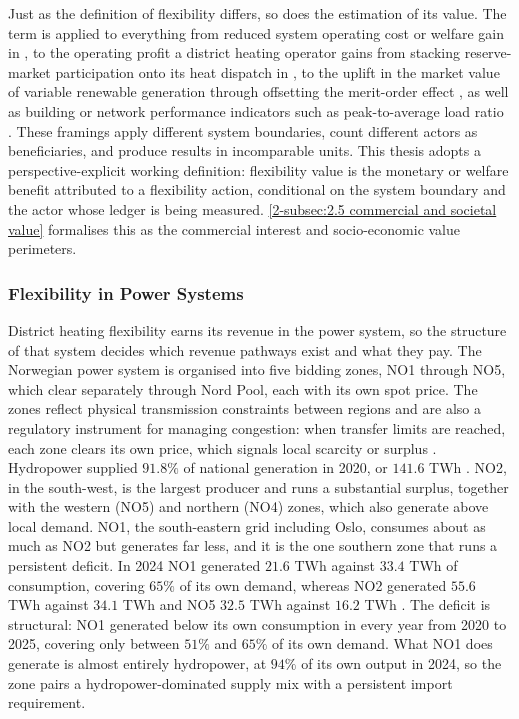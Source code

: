 Just as the definition of flexibility differs, so does the estimation of its value. The term is applied to everything from reduced system operating cost or welfare gain in \cite{mitridati_heat_2020}, to the operating profit a district heating operator gains from stacking reserve-market participation onto its heat dispatch in \cite{javanshir_operation_2022}, to the uplift in the market value of variable renewable generation through offsetting the merit-order effect \cite{kirkerud_power--heat_2017}, as well as building or network performance indicators such as peak-to-average load ratio \cite{li_ten_2022}. These framings apply different system boundaries, count different actors as beneficiaries, and produce results in incomparable units. This thesis adopts a perspective-explicit working definition: flexibility value is the monetary or welfare benefit attributed to a flexibility action, conditional on the system boundary and the actor whose ledger is being measured. \autoref{2-subsec:2.5 commercial and societal value} formalises this as the commercial interest and socio-economic value perimeters. 

\subsubsection{Flexibility in Power Systems}
\label{2-subsec:2.1.2 flexibility power}

District heating flexibility earns its revenue in the power system, so the structure of that system decides which revenue pathways exist and what they pay. The Norwegian power system is organised into five bidding zones, NO1 through NO5, which clear separately through Nord Pool, each with its own spot price. The zones reflect physical transmission constraints between regions and are also a regulatory instrument for managing congestion: when transfer limits are reached, each zone clears its own price, which signals local scarcity or surplus \cite{iea_-_international_energy_agency_norway_2022}. Hydropower supplied $91.8\%$ of national generation in 2020, or $141.6$ TWh \cite{iea_-_international_energy_agency_norway_2022}. NO2, in the south-west, is the largest producer and runs a substantial surplus, together with the western (NO5) and northern (NO4) zones, which also generate above local demand. NO1, the south-eastern grid including Oslo, consumes about as much as NO2 but generates far less, and it is the one southern zone that runs a persistent deficit. In 2024 NO1 generated $21.6$ TWh against $33.4$ TWh of consumption, covering $65\%$ of its own demand, whereas NO2 generated $55.6$ TWh against $34.1$ TWh and NO5 $32.5$ TWh against $16.2$ TWh \cite{statistisk_sentralbyra_statbank_nodate}. The deficit is structural: NO1 generated below its own consumption in every year from 2020 to 2025, covering only between $51\%$ and $65\%$ of its own demand. What NO1 does generate is almost entirely hydropower, at $94\%$ of its own output in 2024, so the zone pairs a hydropower-dominated supply mix with a persistent import requirement. 

